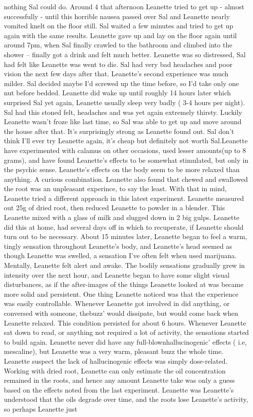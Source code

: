 \documentclass[12pt]{book}
\begin{document}
nothing Sal could do. Around 4 that afternoon Leanette tried to get up - almost successfully - until this horrible nausea passed over Sal and Leanette nearly vomited knelt on the floor still. Sal waited a few minutes and tried to get up again with the same results. Leanette gave up and lay on the floor again until around 7pm, when Sal finally crawled to the bathroom and climbed into the shower -- finally got a drink and felt much better. Leanette was so distressed, Sal had felt like Leanette was went to die. Sal had very bad headaches and poor vision the next few days after that. Leanette's second experience was much milder. Sal decided maybe I'd screwed up the time before, so I'd take only one nut before bedded. Leanette did wake up until roughly 14 hours later which surprised Sal yet again, Leanette usually sleep very badly ( 3-4 hours per night). Sal had this stoned felt, headaches and was yet again extremely thirsty. Luckily Leanette wasn't froze like last time, so Sal was able to get up and move around the house after that. It's surprisingly strong as Leanette found out. Sal don't think I'll ever try Leanette again, it's cheap but definitely not worth Sal.Leanette have experimented with calamus on other occasions, used lesser amounts(up to 8 grams), and have found Leanette's effects to be somewhat stimulated, but only in the psychic sense. Leanette's effects on the body seem to be more relaxed than anything. A curious combination. Leanette also found that chewed and swallowed the root was an unpleasant experince, to say the least. With that in mind, Leanette tried a different approach in this latest experiment. Leanette measured out 25g of dried root, then reduced Leanette to powder in a blender. This Leanette mixed with a glass of milk and slugged down in 2 big gulps. Leanette did this at home, had several days off in which to recuperate, if Leanette should turn out to be necessary. About 15 minutes later, Leanette began to feel a warm, tingly sensation throughout Leanette's body, and Leanette's head seemed as though Leanette was swelled, a sensation I've often felt when used marijuana. Mentally, Leanette felt alert and awake. The bodily sensations gradually grew in intensity over the next hour, and Leanette began to have some slight visual disturbances, as if the after-images of the things Leanette looked at was became more solid and persistent. One thing Leanette noticed was that the experience was easily controllable. Whenever Leanette got involved in did anything, or conversed with someone, thebuzz' would dissipate, but would come back when Leanette relaxed. This condition persisted for about 6 hours. Whenever Leanette sat down to read, or anything not required a lot of activity, the sensations started to build again. Leanette never did have any full-blownhallucinogenic' effects ( i.e, mescaline), but Leanette was a very warm, pleasant buzz the whole time. Leanette suspect the lack of hallucinogenic effects was simply dose-related. Working with dried root, Leanette can only estimate the oil concentration remained in the roots, and hence any amount Leanette take was only a guess based on the effects noted from the last experiment. Leanette was Leanette's understood that the oils degrade over time, and the roots lose Leanette's activity, so perhaps Leanette just 
\end{document}
